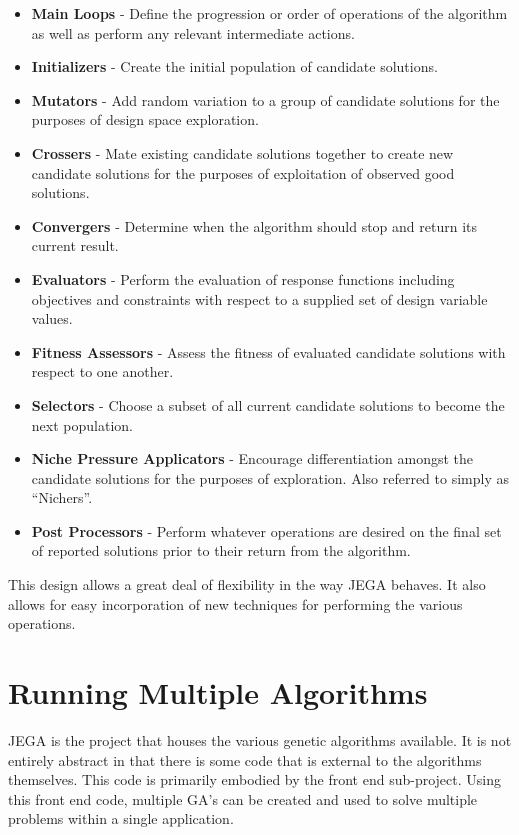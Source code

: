 \begin{itemize}

\item \textbf{Main Loops} - Define the progression or order of operations of
the algorithm as well as perform any relevant intermediate actions.

\item \textbf{Initializers} - Create the initial population of candidate
solutions.

\item \textbf{Mutators} - Add random variation to a group of candidate
solutions for the purposes of design space exploration.

\item \textbf{Crossers} - Mate existing candidate solutions together to
create new candidate solutions for the purposes of exploitation of
observed good solutions.

\item \textbf{Convergers} - Determine when the algorithm should stop and
return its current result.

\item \textbf{Evaluators} - Perform the evaluation of response functions
including objectives and constraints with respect to a supplied set
of design variable values.

\item \textbf{Fitness Assessors} - Assess the fitness of evaluated candidate solutions with respect to one another.

\item \textbf{Selectors} - Choose a subset of all current candidate solutions
to become the next population.

\item \textbf{Niche Pressure Applicators} - Encourage
differentiation amongst the candidate solutions for the purposes of
exploration.  Also referred to simply as ``Nichers''.

\item \textbf{Post Processors} - Perform whatever operations are desired on
the final set of reported solutions prior to their return from the
algorithm.

\end{itemize}

This design allows a great deal of flexibility in the way JEGA
behaves.  It also allows for easy incorporation of new techniques
for performing the various operations.

\section{Running Multiple Algorithms} \label{sec:multiple_algs}
JEGA is the project that houses the various genetic algorithms
available.  It is not entirely abstract in that there is some code
that is external to the algorithms themselves.  This code is
primarily embodied by the front end sub-project.  Using this front
end code, multiple GA's can be created and used to solve multiple
problems within a single application.

